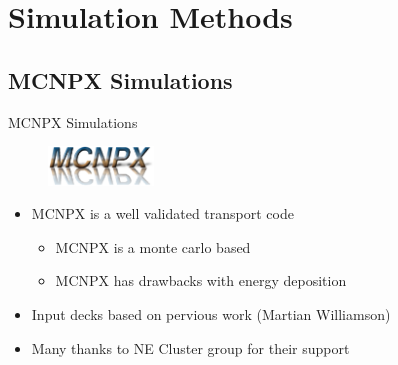 
% 
%
\section{Simulation Methods}

\subsection{MCNPX Simulations}
\begin{frame}{MCNPX Simulations}
	\centering
	\begin{figure}
		\includegraphics[width=0.25\textwidth]{images/logo-mcnpx.eps}
	\end{figure}
\begin{itemize}
    \item MCNPX is a well validated transport code \cite{pelowitz_mcnpx_2010}
    \begin{itemize}
        \item MCNPX is a monte carlo based
        \item MCNPX has drawbacks with energy deposition
    \end{itemize}
    \item Input decks based on pervious work (Martian Williamson)
    \item Many thanks to NE Cluster group for their support
\end{itemize}
\end{frame}
